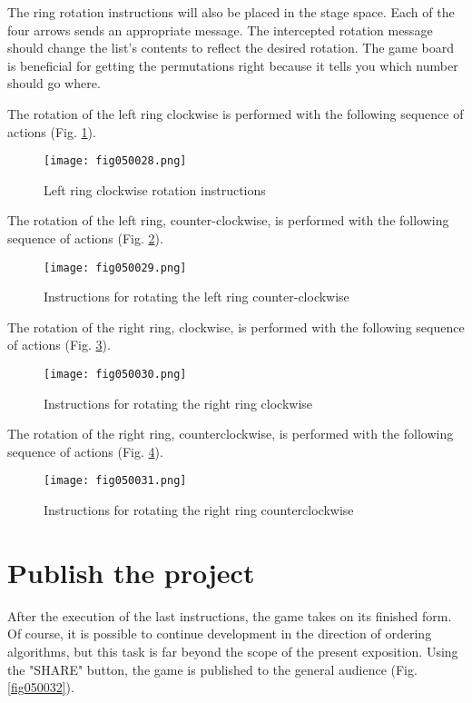 The ring rotation instructions will also be placed in the stage space. Each of the four arrows sends an appropriate message. The intercepted rotation message should change the list's contents to reflect the desired rotation. The game board is beneficial for getting the permutations right because it tells you which number should go where.

The rotation of the left ring clockwise is performed with the following sequence of actions (Fig. \ref{fig050028}).

\begin{figure}[H]
   \centering
   \texttt{[image: fig050028.png]}
   \caption{Left ring clockwise rotation instructions}
\label{fig050028}
\end{figure}

The rotation of the left ring, counter-clockwise, is performed with the following sequence of actions (Fig. \ref{fig050029}).

\begin{figure}[H]
   \centering
   \texttt{[image: fig050029.png]}
   \caption{Instructions for rotating the left ring counter-clockwise}
\label{fig050029}
\end{figure}

The rotation of the right ring, clockwise, is performed with the following sequence of actions (Fig. \ref{fig050030}).

\begin{figure}[H]
   \centering
   \texttt{[image: fig050030.png]}
   \caption{Instructions for rotating the right ring clockwise}
\label{fig050030}
\end{figure}

The rotation of the right ring, counterclockwise, is performed with the following sequence of actions (Fig. \ref{fig050031}).

\begin{figure}[H]
   \centering
   \texttt{[image: fig050031.png]}
   \caption{Instructions for rotating the right ring counterclockwise}
\label{fig050031}
\end{figure}

\section{Publish the project}

After the execution of the last instructions, the game takes on its finished form. Of course, it is possible to continue development in the direction of ordering algorithms, but this task is far beyond the scope of the present exposition. Using the "SHARE" button, the game is published to the general audience (Fig. \ref{fig050032}).

